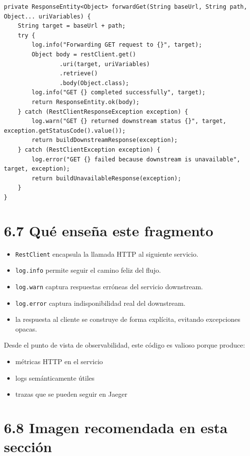 \documentclass[
a4paper,
12pt]{report}
\providecommand{\tightlist}{%
  \setlength{\itemsep}{0pt}\setlength{\parskip}{0pt}}
\begin{document}
\begin{verbatim}
private ResponseEntity<Object> forwardGet(String baseUrl, String path, Object... uriVariables) {
    String target = baseUrl + path;
    try {
        log.info("Forwarding GET request to {}", target);
        Object body = restClient.get()
                .uri(target, uriVariables)
                .retrieve()
                .body(Object.class);
        log.info("GET {} completed successfully", target);
        return ResponseEntity.ok(body);
    } catch (RestClientResponseException exception) {
        log.warn("GET {} returned downstream status {}", target, exception.getStatusCode().value());
        return buildDownstreamResponse(exception);
    } catch (RestClientException exception) {
        log.error("GET {} failed because downstream is unavailable", target, exception);
        return buildUnavailableResponse(exception);
    }
}
\end{verbatim}

\section{6.7 Qué enseña este
fragmento}\label{quuxe9-enseuxf1a-este-fragmento}

\begin{itemize}
\tightlist
\item
  \texttt{RestClient} encapsula la llamada HTTP al siguiente servicio.
\item
  \texttt{log.info} permite seguir el camino feliz del flujo.
\item
  \texttt{log.warn} captura respuestas erróneas del servicio downstream.
\item
  \texttt{log.error} captura indisponibilidad real del downstream.
\item
  la respuesta al cliente se construye de forma explícita, evitando
  excepciones opacas.
\end{itemize}

Desde el punto de vista de observabilidad, este código es valioso porque
produce:

\begin{itemize}
\tightlist
\item
  métricas HTTP en el servicio
\item
  logs semánticamente útiles
\item
  trazas que se pueden seguir en Jaeger
\end{itemize}

\section{6.8 Imagen recomendada en esta
sección}\label{imagen-recomendada-en-esta-secciuxf3n}
\end{document}
